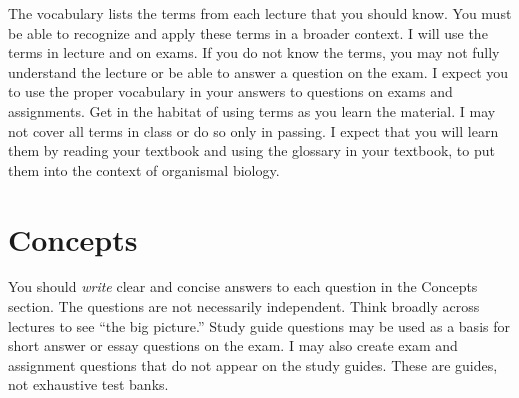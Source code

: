 \documentclass[nofonts, letterpaper]{tufte-handout}
\begin{document}
The vocabulary lists the terms from each lecture that you should know. You must be able to recognize and apply these terms in a broader context.  I will use the terms in lecture and on exams. If you do not know the terms, you may not fully understand the lecture or be able to answer a question on the exam. I expect you to use the proper vocabulary in your answers to questions on exams and assignments.  Get in the habitat of using terms as you learn the material.  I may not cover all terms in class or do so only in passing.  I expect that you will learn them by reading your textbook and using the glossary in your textbook, to put them into the context of organismal biology.

\section{Concepts}

You should \emph{write} clear and concise answers to each question in the Concepts section.  The questions are not necessarily independent.  Think broadly across lectures to see ``the big picture.''  Study guide questions may be used as a basis for short answer or essay questions on the exam. I may also create exam and assignment questions that do not appear on the study guides. These are guides, not exhaustive test banks.
\end{document}
